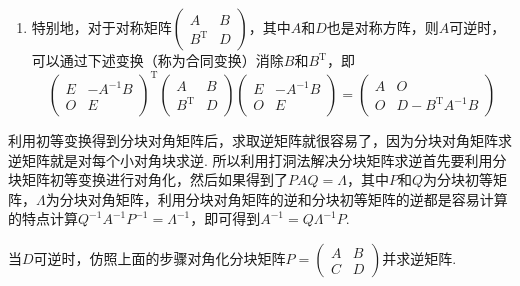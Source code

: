 \begin{enumerate}
    \item 特别地，对于对称矩阵$\begin{pmatrix}A & B \\ B^\mathrm{T} & D\end{pmatrix}$，其中$A$和$D$也是对称方阵，则$A$可逆时，可以通过下述变换（称为合同变换）消除$B$和$B^\mathrm{T}$，即
          \[ \begin{pmatrix}
                  E & -A^{-1}B \\ O & E
              \end{pmatrix}^\mathrm{T}\begin{pmatrix}
                  A & B \\ B^\mathrm{T} & D
              \end{pmatrix}\begin{pmatrix}
                  E & -A^{-1}B \\ O & E
              \end{pmatrix}=\begin{pmatrix}
                  A & O \\ O & D-B^\mathrm{T}A^{-1}B
              \end{pmatrix} \]
\end{enumerate}
利用初等变换得到分块对角矩阵后，求取逆矩阵就很容易了，因为分块对角矩阵求逆矩阵就是对每个小对角块求逆. 所以利用打洞法解决分块矩阵求逆首先要利用分块矩阵初等变换进行对角化，然后如果得到了$PAQ=\varLambda$，其中$P$和$Q$为分块初等矩阵，$\varLambda$为分块对角矩阵，利用分块对角矩阵的逆和分块初等矩阵的逆都是容易计算的特点计算$Q^{-1}A^{-1}P^{-1}=\varLambda^{-1}$，即可得到$A^{-1}=Q\varLambda^{-1}P$.
\begin{example}
    当$D$可逆时，仿照上面的步骤对角化分块矩阵$P=\begin{pmatrix}A & B \\ C & D\end{pmatrix}$并求逆矩阵.
\end{example}

